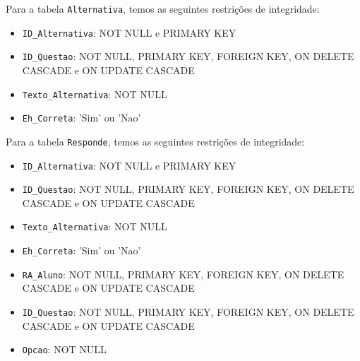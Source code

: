 \documentclass[12pt,a4paper]{article}
\begin{document}
Para a tabela \texttt{Alternativa}, temos as seguintes restrições de integridade:

\begin{itemize}
    \item \texttt{ID\_Alternativa}: NOT NULL e PRIMARY KEY
    \item \texttt{ID\_Questao}: NOT NULL, PRIMARY KEY, FOREIGN KEY, ON DELETE CASCADE e ON UPDATE CASCADE
    \item \texttt{Texto\_Alternativa}: NOT NULL
    \item \texttt{Eh\_Correta}: 'Sim' ou 'Nao'
\end{itemize}

Para a tabela \texttt{Responde}, temos as seguintes restrições de integridade:

\begin{itemize}
    \item \texttt{ID\_Alternativa}: NOT NULL e PRIMARY KEY
    \item \texttt{ID\_Questao}: NOT NULL, PRIMARY KEY, FOREIGN KEY, ON DELETE CASCADE e ON UPDATE CASCADE
    \item \texttt{Texto\_Alternativa}: NOT NULL
    \item \texttt{Eh\_Correta}: 'Sim' ou 'Nao'
\end{itemize}

\begin{itemize}
    \item \texttt{RA\_Aluno}: NOT NULL, PRIMARY KEY, FOREIGN KEY, ON DELETE CASCADE e ON UPDATE CASCADE
    \item \texttt{ID\_Questao}: NOT NULL, PRIMARY KEY, FOREIGN KEY, ON DELETE CASCADE e ON UPDATE CASCADE
    \item \texttt{Opcao}: NOT NULL
\end{itemize}
\end{document}
